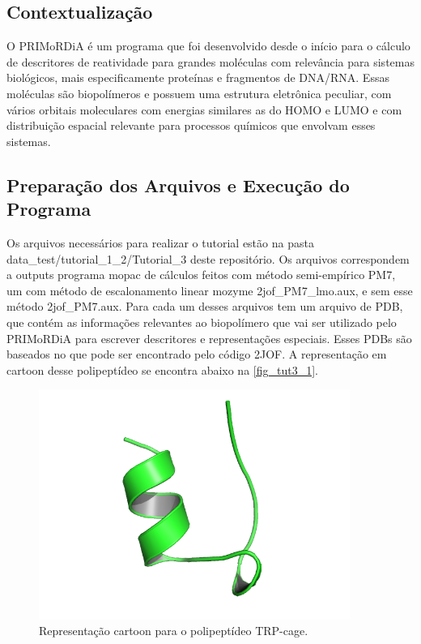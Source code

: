 \documentclass[a4paper,11pt]{refart}
\begin{document}
\subsection{Contextualização}

O PRIMoRDiA é um programa que foi desenvolvido desde o início para o cálculo de descritores de reatividade para grandes moléculas com relevância para sistemas biológicos, mais especificamente proteínas e fragmentos de DNA/RNA. Essas moléculas são biopolímeros e possuem uma estrutura eletrônica peculiar, com vários orbitais moleculares com energias similares as do HOMO e LUMO e com distribuição espacial relevante para processos químicos que envolvam esses sistemas.

\subsection{Preparação dos Arquivos e Execução do Programa}

Os arquivos necessários para realizar o tutorial estão na pasta data\_test/tutorial\_1\_2/Tutorial\_3 deste repositório. Os arquivos correspondem a outputs programa mopac de cálculos feitos com método semi-empírico PM7, um com método de escalonamento linear mozyme 2jof\_PM7\_lmo.aux, e sem esse método 2jof\_PM7.aux. Para cada um desses arquivos tem um arquivo de PDB, que contém as informações relevantes ao biopolímero que vai ser utilizado pelo PRIMoRDiA para escrever descritores e representações especiais. Esses PDBs são baseados no que pode ser encontrado pelo código 2JOF. A representação em cartoon desse polipeptídeo se encontra abaixo na \autoref{fig_tut3_1}.


\hspace*{-\leftmarginwidth}
\begin{minipage}{\fullwidth}
	\begin{figure}[H]
		\begin{center}
			\includegraphics[width=4in]{images/tut3_img1}
			\caption{Representação cartoon para o polipeptídeo TRP-cage.}
			\label{fig_tut3_1}
		\end{center}
	\end{figure}
\end{minipage}
\end{document}
